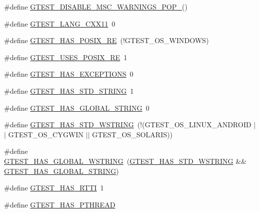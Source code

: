 \begin{DoxyCompactItemize}
\item 
\#define \hyperlink{gtest-port_8h_ab4c44546d6d9aced68993b87b608fc06}{G\+T\+E\+S\+T\+\_\+\+D\+I\+S\+A\+B\+L\+E\+\_\+\+M\+S\+C\+\_\+\+W\+A\+R\+N\+I\+N\+G\+S\+\_\+\+P\+O\+P\+\_\+}()
\item 
\#define \hyperlink{gtest-port_8h_a6e310924e9ce4a9f8fda1b189cc680c4}{G\+T\+E\+S\+T\+\_\+\+L\+A\+N\+G\+\_\+\+C\+X\+X11}~0
\item 
\#define \hyperlink{gtest-port_8h_af5c4295ea1d76f07f65934f659792431}{G\+T\+E\+S\+T\+\_\+\+H\+A\+S\+\_\+\+P\+O\+S\+I\+X\+\_\+\+RE}~(!G\+T\+E\+S\+T\+\_\+\+O\+S\+\_\+\+W\+I\+N\+D\+O\+WS)
\item 
\#define \hyperlink{gtest-port_8h_acecef794eeb09598cd47da764271cb18}{G\+T\+E\+S\+T\+\_\+\+U\+S\+E\+S\+\_\+\+P\+O\+S\+I\+X\+\_\+\+RE}~1
\item 
\#define \hyperlink{gtest-port_8h_aedcf220690e6589d0fc2bd3db768ea66}{G\+T\+E\+S\+T\+\_\+\+H\+A\+S\+\_\+\+E\+X\+C\+E\+P\+T\+I\+O\+NS}~0
\item 
\#define \hyperlink{gtest-port_8h_adba1121430c11cee8ba0c74e8cf6aa40}{G\+T\+E\+S\+T\+\_\+\+H\+A\+S\+\_\+\+S\+T\+D\+\_\+\+S\+T\+R\+I\+NG}~1
\item 
\#define \hyperlink{gtest-port_8h_a6ab57c4a17233dd4ed30c2926bb99cc5}{G\+T\+E\+S\+T\+\_\+\+H\+A\+S\+\_\+\+G\+L\+O\+B\+A\+L\+\_\+\+S\+T\+R\+I\+NG}~0
\item 
\#define \hyperlink{gtest-port_8h_a6e087748d8bbd2ca57c487b6ad268670}{G\+T\+E\+S\+T\+\_\+\+H\+A\+S\+\_\+\+S\+T\+D\+\_\+\+W\+S\+T\+R\+I\+NG}~(!(G\+T\+E\+S\+T\+\_\+\+O\+S\+\_\+\+L\+I\+N\+U\+X\+\_\+\+A\+N\+D\+R\+O\+ID $\vert$$\vert$ G\+T\+E\+S\+T\+\_\+\+O\+S\+\_\+\+C\+Y\+G\+W\+IN $\vert$$\vert$ G\+T\+E\+S\+T\+\_\+\+O\+S\+\_\+\+S\+O\+L\+A\+R\+IS))
\item 
\#define \hyperlink{gtest-port_8h_afca9ecaf5846561187a15b75013aa85b}{G\+T\+E\+S\+T\+\_\+\+H\+A\+S\+\_\+\+G\+L\+O\+B\+A\+L\+\_\+\+W\+S\+T\+R\+I\+NG}~(\hyperlink{gtest-port_8h_a6e087748d8bbd2ca57c487b6ad268670}{G\+T\+E\+S\+T\+\_\+\+H\+A\+S\+\_\+\+S\+T\+D\+\_\+\+W\+S\+T\+R\+I\+NG} \&\& \hyperlink{gtest-port_8h_a6ab57c4a17233dd4ed30c2926bb99cc5}{G\+T\+E\+S\+T\+\_\+\+H\+A\+S\+\_\+\+G\+L\+O\+B\+A\+L\+\_\+\+S\+T\+R\+I\+NG})
\item 
\#define \hyperlink{gtest-port_8h_a9ba781217167f905bff2f1c410a97930}{G\+T\+E\+S\+T\+\_\+\+H\+A\+S\+\_\+\+R\+T\+TI}~1
\item 
\#define \hyperlink{gtest-port_8h_a3341397e1952de0b9cd88762d4d3ae4b}{G\+T\+E\+S\+T\+\_\+\+H\+A\+S\+\_\+\+P\+T\+H\+R\+E\+AD}
\item 

\end{DoxyCompactItemize}

